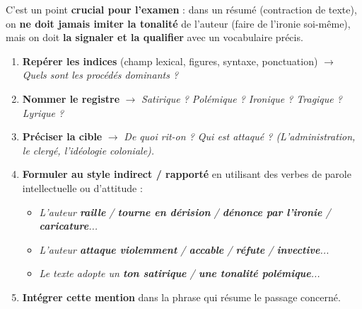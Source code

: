 \documentclass[11pt]{article}
\newcommand{\cle}[1]{{\popxbold\color{popdark}#1}}
\begin{document}
C'est un point \textbf{crucial pour l'examen} : dans un résumé (contraction de texte), on \textbf{ne doit jamais imiter la tonalité} de l'auteur (faire de l'ironie soi-même), mais on doit \textbf{la signaler et la qualifier} avec un vocabulaire précis.

\begin{methode}
\begin{enumerate}
    \item \textbf{Repérer les indices} (champ lexical, figures, syntaxe, ponctuation) $\rightarrow$ \emph{Quels sont les procédés dominants ?}
    \item \textbf{Nommer le registre} $\rightarrow$ \emph{Satirique ? Polémique ? Ironique ? Tragique ? Lyrique ?}
    \item \textbf{Préciser la cible} $\rightarrow$ \emph{De quoi rit-on ? Qui est attaqué ? (L'administration, le clergé, l'idéologie coloniale).}
    \item \textbf{Formuler au style indirect / rapporté} en utilisant des verbes de \cle{parole intellectuelle} ou \cle{d'attitude} :
    \begin{itemize}
        \item \emph{L'auteur \textbf{raille} / \textbf{tourne en dérision} / \textbf{dénonce par l'ironie} / \textbf{caricature}...}
        \item \emph{L'auteur \textbf{attaque violemment} / \textbf{accable} / \textbf{réfute} / \textbf{invective}...}
        \item \emph{Le texte adopte un \textbf{ton satirique} / \textbf{une tonalité polémique}...}
    \end{itemize}
    \item \textbf{Intégrer cette mention} dans la phrase qui résume le passage concerné.
\end{enumerate}
\end{methode}
\end{document}
